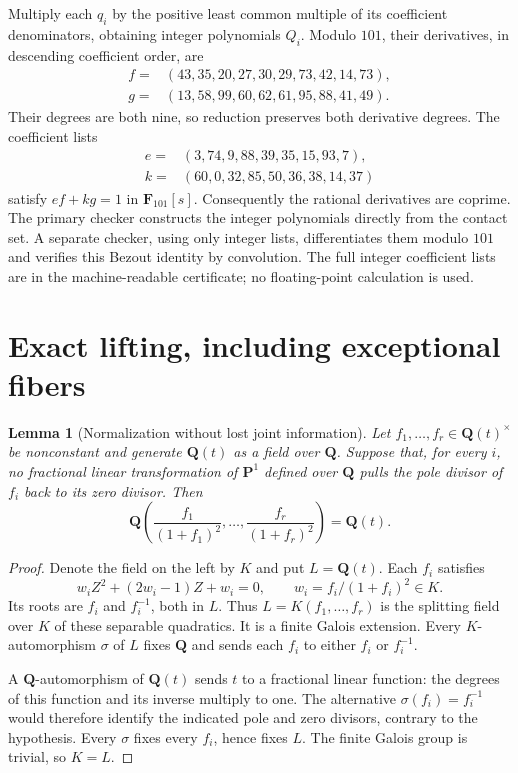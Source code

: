 \documentclass[11pt,a4paper]{article}
\newcommand{\Q}{\mathbf Q}
\newcommand{\Pp}{\mathbf P}
\newtheorem{lemma}[theorem]{Lemma}
\begin{document}
Multiply each $q_i$ by the positive least common multiple of its
coefficient denominators, obtaining integer polynomials $Q_i$.
Modulo $101$, their derivatives, in descending coefficient order,
are
\[
\begin{split}
 f={}&(43,35,20,27,30,29,73,42,14,73),\\
 g={}&(13,58,99,60,62,61,95,88,41,49).
\end{split}
\]
Their degrees are both nine, so reduction preserves both derivative
degrees. The coefficient lists
\[
\begin{split}
 e={}&(3,74,9,88,39,35,15,93,7),\\
 k={}&(60,0,32,85,50,36,38,14,37)
\end{split}
\]
satisfy $ef+kg=1$ in $\mathbf F_{101}[s]$.
Consequently the rational derivatives are coprime. The primary
checker constructs the integer polynomials directly from the contact
set. A separate checker, using only integer lists, differentiates
them modulo $101$ and verifies this Bezout identity by convolution.
The full integer coefficient lists are in the machine-readable
certificate; no floating-point calculation is used.

\section{Exact lifting, including exceptional fibers}

\begin{lemma}[Normalization without lost joint information]\label{lem:normalization}
Let $f_1,\ldots,f_r\in\Q(t)^\times$ be nonconstant and generate
$\Q(t)$ as a field over $\Q$. Suppose that, for every $i$, no
fractional linear transformation of $\Pp^1$ defined over $\Q$
pulls the pole divisor of $f_i$ back to its zero divisor.
Then
\[
 \Q\left(\frac{f_1}{(1+f_1)^2},\ldots,
          \frac{f_r}{(1+f_r)^2}\right)=\Q(t).
\]
\end{lemma}
\begin{proof}
Denote the field on the left by $K$ and put $L=\Q(t)$.
Each $f_i$ satisfies
\[
 w_i Z^2+(2w_i-1)Z+w_i=0,\qquad
 w_i=f_i/(1+f_i)^2\in K.
\]
Its roots are $f_i$ and $f_i^{-1}$, both in $L$.
Thus $L=K(f_1,\ldots,f_r)$ is the splitting field over $K$ of
these separable quadratics. It is a finite Galois extension.
Every $K$-automorphism $\sigma$ of $L$ fixes $\Q$ and sends
each $f_i$ to either $f_i$ or $f_i^{-1}$.

A $\Q$-automorphism of $\Q(t)$ sends $t$ to a fractional linear
function: the degrees of this function and its inverse multiply to
one. The alternative $\sigma(f_i)=f_i^{-1}$ would therefore
identify the indicated pole and zero divisors, contrary to the
hypothesis. Every $\sigma$ fixes every $f_i$, hence fixes $L$.
The finite Galois group is trivial, so $K=L$.
\end{proof}
\end{document}
